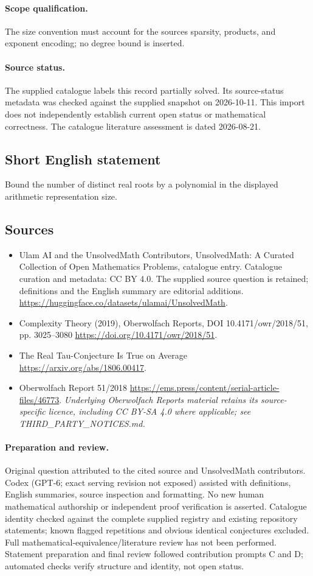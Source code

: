 \documentclass[11pt]{article}
\begin{document}
\paragraph{Scope qualification.}
The size convention must account for the source\textquotesingle s sparsity, products, and exponent encoding; no degree bound is inserted.
\paragraph{Source status.}
The supplied catalogue labels this record partially solved. Its source-status metadata was checked against the supplied snapshot on 2026-10-11. This import does not independently establish current open status or mathematical correctness. The catalogue literature assessment is dated 2026-08-21.
\subsection{Short English statement}
Bound the number of distinct real roots by a polynomial in the displayed arithmetic representation size.
\subsection{Sources}
\begin{itemize}
\item[S1] Ulam AI and the UnsolvedMath Contributors, UnsolvedMath: A Curated Collection of Open Mathematics Problems, catalogue entry. Catalogue curation and metadata: CC BY 4.0. The supplied source question is retained; definitions and the English summary are editorial additions.
\url{https://huggingface.co/datasets/ulamai/UnsolvedMath}.
\item[S2] Complexity Theory (2019), Oberwolfach Reports, DOI 10.4171/owr/2018/51, pp. 3025--3080
\url{https://doi.org/10.4171/owr/2018/51}.
\item[S3] The Real Tau-Conjecture Is True on Average
\url{https://arxiv.org/abs/1806.00417}.
\item[S4] Oberwolfach Report 51/2018
\url{https://ems.press/content/serial-article-files/46773}.
\textit{Underlying Oberwolfach Reports material retains its source-specific licence, including CC BY-SA 4.0 where applicable; see THIRD\_PARTY\_NOTICES.md.}
\end{itemize}
\paragraph{Preparation and review.}
Original question attributed to the cited source and UnsolvedMath contributors. Codex (GPT-6; exact serving revision not exposed) assisted with definitions, English summaries, source inspection and formatting. No new human mathematical authorship or independent proof verification is asserted. Catalogue identity checked against the complete supplied registry and existing repository statements; known flagged repetitions and obvious identical conjectures excluded. Full mathematical-equivalence/literature review has not been performed. Statement preparation and final review followed contribution prompts C and D; automated checks verify structure and identity, not open status.
\label{end:statement}
\end{document}
